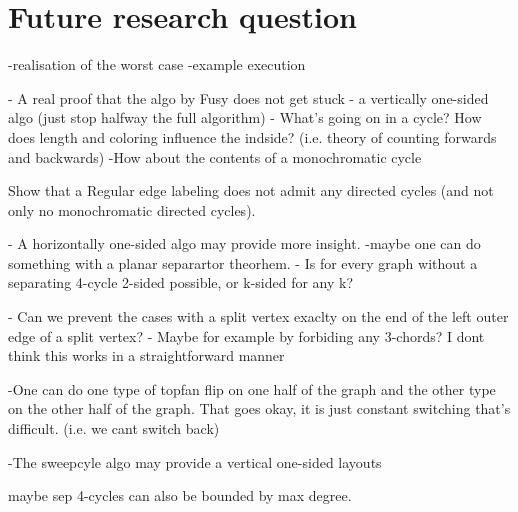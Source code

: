 \section{Future research question}
\thispagestyle{plain}

-realisation of the worst case
-example execution


- A real proof that the algo by Fusy does not get stuck
- a vertically one-sided algo (just stop halfway the full algorithm)
- What's going on in a cycle? How does length and coloring influence the indside? (i.e. theory of counting forwards and backwards)
  -How about the contents of a monochromatic cycle

Show that a Regular edge labeling does not admit any directed cycles (and not only no monochromatic directed cycles).

- A horizontally one-sided algo may provide more insight.
-maybe one can do something with a planar separartor theorhem.
- Is for every graph without a separating 4-cycle 2-sided possible, or k-sided for any k?

- Can we prevent the cases with a split vertex exaclty on the end of the left outer edge of a split vertex?
      - Maybe for example by forbiding any 3-chords? I dont think this works in a straightforward manner

-One can do one type of topfan flip on one half of the graph and the other type on the other half of the graph. That goes okay, it is just constant switching that's difficult. (i.e. we cant switch back)

-The sweepcyle algo may provide a vertical one-sided layouts


maybe sep 4-cycles can also be bounded by max degree.
